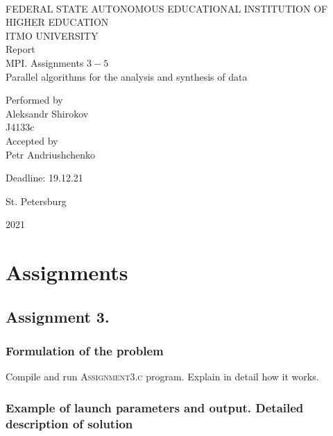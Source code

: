 \documentclass[%
12pt, %
final, %
oneside, %
onecolumn, %
centertags]{article} %
\theoremstyle{plain}
\theoremstyle{definition}
\theoremstyle{remark}
\begin{document}
	\begin{titlepage} 
		\begin{center}
		\textbf{}\\[2.0cm]
		\LARGE FEDERAL STATE AUTONOMOUS EDUCATIONAL INSTITUTION OF HIGHER EDUCATION \\[0.5cm]
		\Large ITMO UNIVERSITY \\[3cm]
		\LARGE Report\\
		\Large MPI. Assignments $3-5$ \\
		\Large Parallel algorithms for the analysis and synthesis of data \\[4cm]


		\begin{flushright}
		Performed by\\
		Aleksandr Shirokov\\
		J4133c\\
		Accepted by\\
		Petr Andriushchenko

		Deadline: 19.12.21
		\end{flushright}

		\vfill 

		{\Large {St. Petersburg}} \par
		{\Large {2021}}
		\end{center} 
	\end{titlepage}

\tableofcontents
\newpage


\section{Assignments}

\subsection{Assignment 3.}

\subsubsection{Formulation of the problem}

Compile and run \textsc{Assignment3.c} program. Explain in detail how it works.

\subsubsection{Example of launch parameters and output. Detailed description of solution}
\end{document}
